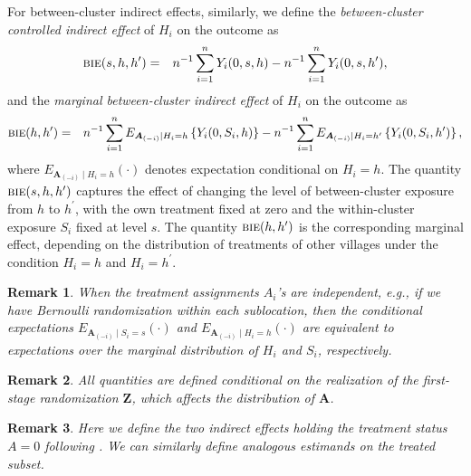 \documentclass{article}
\newtheorem{remark}{Remark}[section]
\newcommand{\bZ}{\boldsymbol{Z}}
\newcommand{\bA}{\boldsymbol{A}}
\newcommand{\sumi}{\sum_{i=1}^n}
\newcommand{\bie}{\textsc{bie}}
\begin{document}
For between-cluster indirect effects, similarly, we define the \textit{between-cluster controlled indirect effect} of $H_{i}$ on the outcome as
\begin{eqnarray*}
    \bie(s,h,h^{\prime}) &=& n^{-1}\sumi Y_{i}(0,s,h) - n^{-1}\sumi Y_{i}(0,s,h^{\prime}),
\end{eqnarray*}
and the \textit{marginal between-cluster indirect effect} of $H_{i}$ on the outcome as
\begin{eqnarray*}
    \bie(h,h^{\prime}) &=& n^{-1}\sumi E_{\bA_{(-i)}\mid H_{i} = h}\left\{Y_{i}(0,S_{i},h)\right\} - n^{-1}\sumi E_{\bA_{(-i)}\mid H_{i} = h^{\prime}}\left\{Y_{i}(0,S_{i},h^{\prime})\right\},
\end{eqnarray*}
where $E_{\bA_{(-i)}\mid H_{i} = h}(\cdot)$ denotes expectation conditional on $H_{i}=h$. The quantity $\bie(s,h,h^{\prime})$ captures the effect of changing the level of between-cluster exposure from $h$ to $h^{\prime}$, with the own treatment fixed at zero and the within-cluster exposure $S_{i}$ fixed at level $s$. The quantity $\bie(h,h^{\prime})$ is the corresponding marginal effect, depending on the distribution of treatments of other villages under the condition $H_{i}=h$ and $H_{i}=h^{\prime}$.

\begin{remark}
    When the treatment assignments $A_{i}$'s are independent, e.g., if we have Bernoulli randomization within each sublocation, then the conditional expectations $E_{\bA_{(-i)}\mid S_{i} = s}(\cdot)$ and $E_{\bA_{(-i)}\mid H_{i} = h}(\cdot)$ are equivalent to expectations over the marginal distribution of $H_{i}$ and $S_{i}$, respectively.
\end{remark}

\begin{remark}
    All quantities are defined conditional on the realization of the first-stage randomization $\bZ$, which affects the distribution of $\bA$.
\end{remark}

\begin{remark}
    Here we define the two indirect effects holding the treatment status $A=0$ following \cite{hudgens2008toward}. We can similarly define analogous estimands on the treated subset.
\end{remark}
\end{document}
